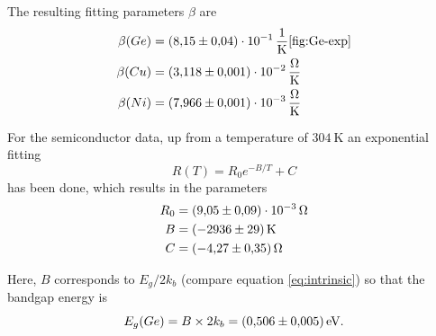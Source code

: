 The resulting fitting parameters $\beta$ are
\begin{align*}
    \beta(Ge) &= \SI{8.15 \pm 0.04 e-1}{\per\kelvin} \ref{fig:Ge-exp}\\
    \beta(Cu) &= \SI{3.118 \pm 0.001 e-2}{\ohm\per\kelvin} \\
    \beta(Ni) &= \SI{7.966 \pm 0.001 e-3}{\ohm\per\kelvin} \\
\end{align*}\label{equ:results-beta}

For the semiconductor data, up from a temperature of $\SI{304}{\kelvin}$ an exponential fitting 
\begin{equation}
    R(T) = R_0 e^{-B/T} + C
\end{equation}
has been done, which results in the parameters
\begin{align*}
    R_0 &= \SI{9.05 \pm 0.09 e-3}{\ohm} \\
    B &= \SI{-2936 \pm 29 }{\kelvin} \\
    C &= \SI{-4.27 \pm 0.35 }{\ohm} \\
\end{align*} 

Here, $B$ corresponds to $E_g/2k_b$ (compare equation \ref{eq:intrinsic}) so that the bandgap energy is
\begin{equation}
E_g(Ge) = B \times 2 k_b = \SI{0.506 \pm 0.005 }{\eV}.
\end{equation}


